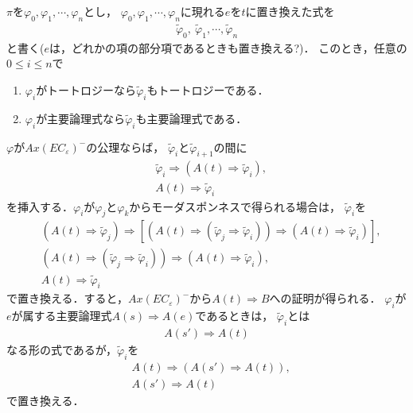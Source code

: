 	$\pi$を$\varphi_{0},\varphi_{1},\cdots,\varphi_{n}$とし，
	$\varphi_{0},\varphi_{1},\cdots,\varphi_{n}$に現れる$e$を$t$に置き換えた式を
	\begin{align}
		\tilde{\varphi}_{0},\ \tilde{\varphi}_{1},\cdots, \tilde{\varphi}_{n}
	\end{align}
	と書く($e$は，どれかの項の部分項であるときも置き換える?)．
	このとき，任意の$0 \leq i \leq n$で
	\begin{enumerate}
		\item $\varphi_{i}$がトートロジーなら$\tilde{\varphi}_{i}$もトートロジーである．
		\item $\varphi_{i}$が主要論理式なら$\tilde{\varphi}_{i}$も主要論理式である．
	\end{enumerate}
	
	$\varphi$が$Ax(EC_{\varepsilon})^{-}$の公理ならば，
	$\tilde{\varphi}_{i}$と$\tilde{\varphi}_{i+1}$の間に
	\begin{align}
		&\tilde{\varphi}_{i} \Longrightarrow 
		\left( A(t) \Longrightarrow \tilde{\varphi}_{i} \right), \\
		&A(t) \Longrightarrow \tilde{\varphi}_{i}
	\end{align}
	を挿入する．$\varphi_{i}$が$\varphi_{j}$と$\varphi_{k}$からモーダスポンネスで得られる場合は，
	$\tilde{\varphi}_{i}$を
	\begin{align}
		&\left( A(t) \Longrightarrow \tilde{\varphi}_{j} \right)
		\Longrightarrow \left[ \left( A(t) \Longrightarrow 
		\left( \tilde{\varphi}_{j}\Longrightarrow \tilde{\varphi}_{i} \right) \right)
		\Longrightarrow \left( A(t) \Longrightarrow \tilde{\varphi}_{i} \right) \right], \\
		&\left( A(t) \Longrightarrow 
		\left( \tilde{\varphi}_{j}\Longrightarrow \tilde{\varphi}_{i} \right) \right)
		\Longrightarrow \left( A(t) \Longrightarrow \tilde{\varphi}_{i} \right), \\
		&A(t) \Longrightarrow \tilde{\varphi}_{i}
	\end{align}
	で置き換える．すると，$Ax(EC_{\varepsilon})^{-}$から$A(t) \Longrightarrow B$への証明が得られる．
	$\varphi_{i}$が$e$が属する主要論理式$A(s) \Longrightarrow A(e)$であるときは，
	$\tilde{\varphi}_{i}$とは
	\begin{align}
		A(s') \Longrightarrow A(t)
	\end{align}
	なる形の式であるが，$\tilde{\varphi}_{i}$を
	\begin{align}
		&A(t) \Longrightarrow (A(s') \Longrightarrow A(t)), \\
		&A(s') \Longrightarrow A(t)
	\end{align}
	で置き換える．
	
